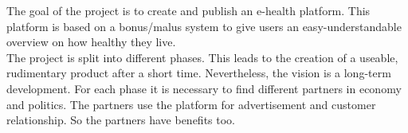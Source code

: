 \documentclass[a4paper,11pt]{article}
\providecommand*{\note}[1]{\small \textcolor{RoyalBlue}{\begin{minipage}{\textwidth}{#1}\end{minipage}}}
\begin{document}

The goal of the project is to create and publish an e-health platform. This platform is based on a bonus/malus system to give users an easy-understandable overview on how healthy they live.\\

The project is split into different phases. This leads to the creation of a useable, rudimentary product after a short time. Nevertheless, the vision is a long-term development. For each phase it is necessary to find different partners in economy and politics. The partners use the platform for advertisement and customer relationship. So the partners have benefits too. \\
\end{document}
